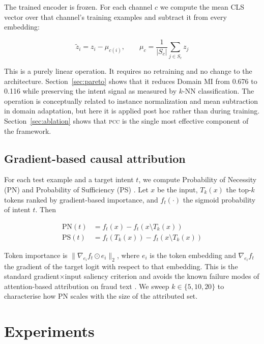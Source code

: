 \documentclass[preprint,12pt,authoryear]{elsarticle}
\newcommand{\pcc}{\textsc{pcc}}
\begin{document}
The trained encoder is frozen. For each channel $c$ we compute the
mean CLS vector over that channel's training examples and subtract
it from every embedding:

\begin{equation}
\tilde{z}_i = z_i - \mu_{c(i)},
\qquad
\mu_c = \frac{1}{|S_c|} \sum_{j \in S_c} z_j
\label{eq:centering}
\end{equation}

This is a purely linear operation. It requires no retraining and no
change to the architecture. Section~\ref{sec:pareto} shows that it
reduces Domain MI from 0.676 to 0.116 while preserving the intent
signal as measured by $k$-NN classification. The operation is
conceptually related to instance normalization and mean subtraction
in domain adaptation, but here it is applied post hoc rather than
during training. Section~\ref{sec:ablation} shows that \pcc{} is the
single most effective component of the framework.

\subsection{Gradient-based causal attribution}

For each test example and a target intent $t$, we compute
Probability of Necessity (PN) and Probability of Sufficiency (PS)
\citep{pearl2009causality}. Let $x$ be the input, $T_k(x)$ the
top-$k$ tokens ranked by gradient-based importance, and $f_t(\cdot)$
the sigmoid probability of intent $t$. Then

\begin{align}
\text{PN}(t) &= f_t(x) - f_t(x \setminus T_k(x)) \\
\text{PS}(t) &= f_t(T_k(x)) - f_t(x \setminus T_k(x))
\end{align}

Token importance is $\| \nabla_{e_i} f_t \odot e_i \|_2$, where
$e_i$ is the token embedding and $\nabla_{e_i} f_t$ the gradient of
the target logit with respect to that embedding. This is the standard
gradient$\times$input saliency criterion and avoids the known
failure modes of attention-based attribution on fraud text
\citep{serrano2019attention}. We sweep $k \in \{5,10,20\}$ to
characterise how PN scales with the size of the attributed set.

\section{Experiments}
\label{sec:exp}
\end{document}
